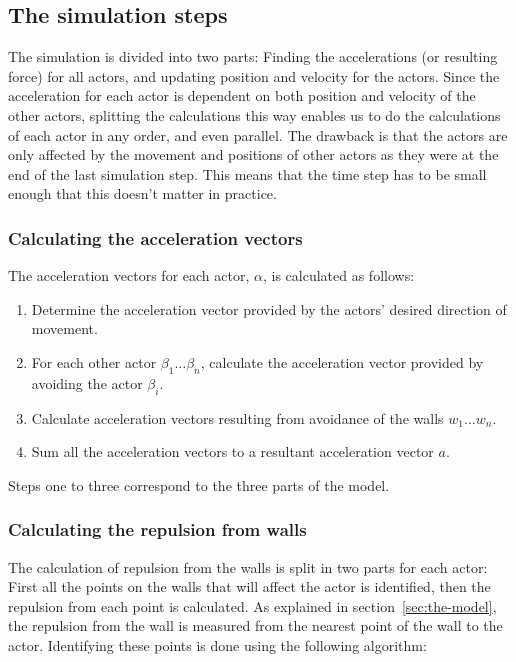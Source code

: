 \subsection{The simulation steps}
The simulation is divided into two parts: Finding the accelerations (or 
resulting force) for all actors, and updating position and velocity for the 
actors.  Since the acceleration for each actor is dependent on both position 
and velocity of the other actors, splitting the calculations this way enables 
us to do the calculations of each actor in any order, and even parallel. The 
drawback is that the actors are only affected by the movement and positions of 
other actors as they were at the end of the last simulation step. This means 
that the time step has to be small enough that this doesn't matter in 
practice.

\subsubsection{Calculating the acceleration vectors}
The acceleration vectors for each actor, $\alpha$, is calculated as follows:

\begin{enumerate}
    \item Determine the acceleration vector provided by the actors' desired 
        direction of movement.
    \item For each other actor $\beta_1\dots\beta_n$, calculate the 
        acceleration vector provided by avoiding the actor $\beta_i$.
    \item Calculate acceleration vectors resulting from avoidance of the walls 
        $w_1\dots w_n$.
    \item Sum all the acceleration vectors to a resultant acceleration vector 
        $a$.
\end{enumerate}

Steps one to three correspond to the three parts of the model.

\subsubsection{Calculating the repulsion from walls}
The calculation of repulsion from the walls is split in two parts for each 
actor: First all the points on the walls that will affect the actor is 
identified, then the repulsion from each point is calculated. As explained in 
section~\ref{sec:the-model}, the repulsion from the wall is measured from the 
nearest point of the wall to the actor. Identifying these points is done using 
the following algorithm:

